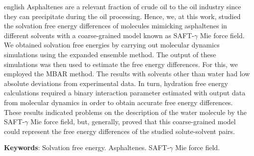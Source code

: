 \documentclass[
	12pt,				%
	openany,			%
	oneside,			%
	a4paper,			%
	english,			%
	brazil				%
	]{abntex2}
\begin{document}
\setlength{\absparsep}{18pt} %
%
\begin{resumo}[Abstract]
 \begin{otherlanguage*}{english}
   Asphaltenes are a  relevant fraction of crude oil to the oil industry since they can precipitate during the oil processing. Hence, we, at this work, studied the solvation free energy differences of molecules mimicking asphaltenes in different solvents with a coarse-grained model known as SAFT-$\gamma$ Mie force field. We obtained solvation free energies  by carrying out molecular dynamics simulations using the expanded ensemble method. The output of these simulations was then used to estimate the free energy differences. For this, we employed the MBAR method. The results with solvents other than water had low absolute deviations from experimental data. In turn, hydration free energy calculations required a binary interaction parameter estimated with output data from molecular dynamics in order to obtain accurate free energy differences. These results indicated problems on the description of the water molecule by the SAFT-$\gamma$ Mie force field, but, generally, proved that this coarse-grained model could represent the free energy differences of the studied solute-solvent pairs.

   \vspace{\onelineskip}
 
   \noindent 
   \textbf{Keywords}: Solvation free energy. Asphaltenes. SAFT-$\gamma$ Mie force field.
 \end{otherlanguage*}
\end{resumo}

\listoffigures*
\cleardoublepage
\end{document}
